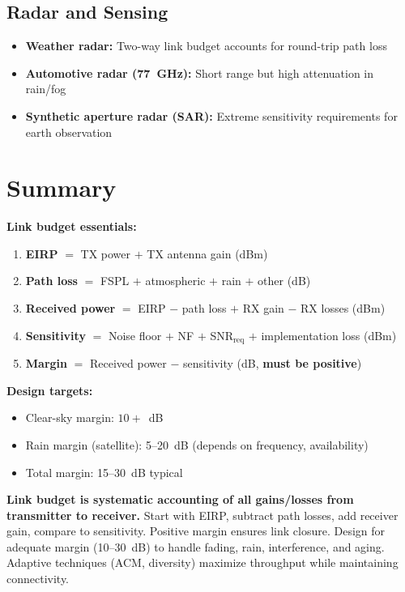 \subsection{Radar and Sensing}

\begin{itemize}
\item \textbf{Weather radar:} Two-way link budget accounts for round-trip path loss
\item \textbf{Automotive radar (77~GHz):} Short range but high attenuation in rain/fog
\item \textbf{Synthetic aperture radar (SAR):} Extreme sensitivity requirements for earth observation
\end{itemize}

\section{Summary}

\textbf{Link budget essentials:}

\begin{enumerate}
\item \textbf{EIRP} $=$ TX power $+$ TX antenna gain (dBm)
\item \textbf{Path loss} $=$ FSPL $+$ atmospheric $+$ rain $+$ other (dB)
\item \textbf{Received power} $=$ EIRP $-$ path loss $+$ RX gain $-$ RX losses (dBm)
\item \textbf{Sensitivity} $=$ Noise floor $+$ NF $+$ SNR$_{\text{req}}$ $+$ implementation loss (dBm)
\item \textbf{Margin} $=$ Received power $-$ sensitivity (dB, \textbf{must be positive})
\end{enumerate}

\textbf{Design targets:}
\begin{itemize}
\item Clear-sky margin: $10+$~dB
\item Rain margin (satellite): 5--20~dB (depends on frequency, availability)
\item Total margin: 15--30~dB typical
\end{itemize}

\begin{keyconcept}
\textbf{Link budget is systematic accounting of all gains/losses from transmitter to receiver.} Start with EIRP, subtract path losses, add receiver gain, compare to sensitivity. Positive margin ensures link closure. Design for adequate margin (10--30~dB) to handle fading, rain, interference, and aging. Adaptive techniques (ACM, diversity) maximize throughput while maintaining connectivity.
\end{keyconcept}

